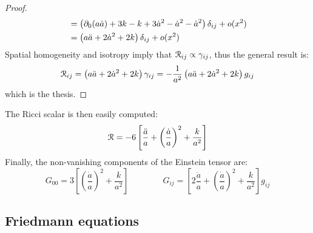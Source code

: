 \begin{proofbox}
\begin{proof}
\begin{equation*}
\begin{split}
        &= \left( \partial_0 (a\dot{a}) + 3k - k + 3 \dot{a}^2 - \dot{a}^2 - \dot{a}^2 \right) \delta_{ij} + o(x^2) \\
        &= \left( a\ddot{a} + 2 \dot{a}^2 + 2k \right) \delta_{ij} + o(x^2)
      \end{split}
    \end{equation*}
    Spatial homogeneity and isotropy imply that $ \EuScript{R}_{ij} \propto \gamma_{ij} $, thus the general result is:
    \begin{equation*}
      \EuScript{R}_{ij} = \left( a\ddot{a} + 2\dot{a}^2 + 2k \right) \gamma_{ij} = - \frac{1}{a^2} \left( a\ddot{a} + 2\dot{a}^2 + 2k \right) g_{ij}
    \end{equation*}
    which is the thesis.
  \end{proof}
\end{proofbox}

The Ricci scalar is then easily computed:
\begin{equation}
  \EuScript{R} = - 6 \left[ \frac{\ddot{a}}{a} + \left( \frac{\dot{a}}{a} \right)^2 + \frac{k}{a^2} \right]
\end{equation}
Finally, the non-vanishing components of the Einstein tensor are:
\begin{equation}
  G_{00} = 3 \left[ \left( \frac{\dot{a}}{a} \right)^2 + \frac{k}{a^2} \right]
  \qquad \qquad
  G_{ij} = \left[ 2 \frac{\ddot{a}}{a} + \left( \frac{\dot{a}}{a} \right)^2 + \frac{k}{a^2} \right] g_{ij}
  \label{eq:flrw-einstein}
\end{equation}

\subsection{Friedmann equations}

